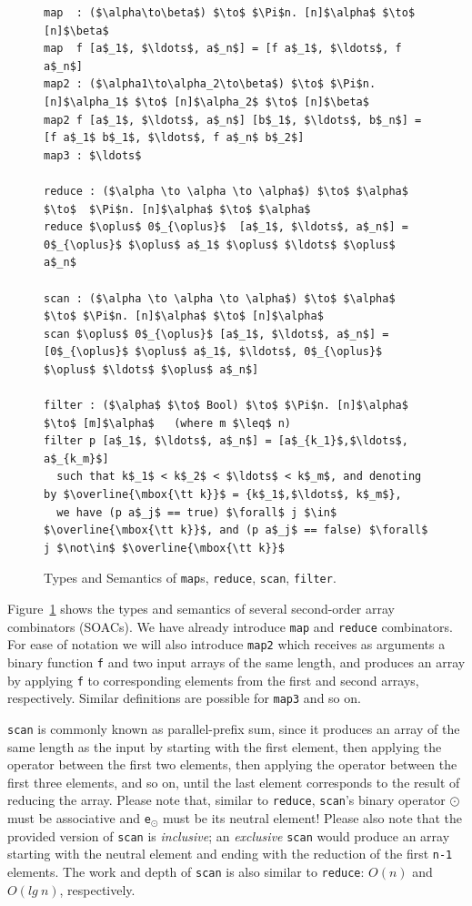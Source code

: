 \documentclass[acmsmall,review]{acmart}\settopmatter{printfolios=true,printccs=false,printacmref=false}
\begin{document}
\begin{figure}
\begin{lstlisting}[mathescape=true]
map  : ($\alpha\to\beta$) $\to$ $\Pi$n. [n]$\alpha$ $\to$ [n]$\beta$
map  f [a$_1$, $\ldots$, a$_n$] = [f a$_1$, $\ldots$, f a$_n$]
map2 : ($\alpha1\to\alpha_2\to\beta$) $\to$ $\Pi$n. [n]$\alpha_1$ $\to$ [n]$\alpha_2$ $\to$ [n]$\beta$
map2 f [a$_1$, $\ldots$, a$_n$] [b$_1$, $\ldots$, b$_n$] = [f a$_1$ b$_1$, $\ldots$, f a$_n$ b$_2$]
map3 : $\ldots$

reduce : ($\alpha \to \alpha \to \alpha$) $\to$ $\alpha$ $\to$  $\Pi$n. [n]$\alpha$ $\to$ $\alpha$
reduce $\oplus$ 0$_{\oplus}$  [a$_1$, $\ldots$, a$_n$] = 0$_{\oplus}$ $\oplus$ a$_1$ $\oplus$ $\ldots$ $\oplus$ a$_n$

scan : ($\alpha \to \alpha \to \alpha$) $\to$ $\alpha$ $\to$ $\Pi$n. [n]$\alpha$ $\to$ [n]$\alpha$
scan $\oplus$ 0$_{\oplus}$ [a$_1$, $\ldots$, a$_n$] = [0$_{\oplus}$ $\oplus$ a$_1$, $\ldots$, 0$_{\oplus}$ $\oplus$ $\ldots$ $\oplus$ a$_n$]

filter : ($\alpha$ $\to$ Bool) $\to$ $\Pi$n. [n]$\alpha$ $\to$ [m]$\alpha$   (where m $\leq$ n)
filter p [a$_1$, $\ldots$, a$_n$] = [a$_{k_1}$,$\ldots$, a$_{k_m}$]
  such that k$_1$ < k$_2$ < $\ldots$ < k$_m$, and denoting by $\overline{\mbox{\tt k}}$ = {k$_1$,$\ldots$, k$_m$},
  we have (p a$_j$ == true) $\forall$ j $\in$ $\overline{\mbox{\tt k}}$, and (p a$_j$ == false) $\forall$ j $\not\in$ $\overline{\mbox{\tt k}}$
\end{lstlisting}\vspace{-4ex}
\caption{Types and Semantics of \lstinline{map}s, \lstinline{reduce}, \lstinline{scan}, \lstinline{filter}.}
\label{fig:futhark-par-ops}
\end{figure}

Figure~\ref{fig:futhark-par-ops} shows the types and semantics of several second-order
array combinators (SOACs). We have already introduce \lstinline{map} and 
\lstinline{reduce} combinators. For ease of notation we will also introduce
\lstinline{map2} which receives as arguments a binary function {\tt f} and 
two input arrays of the same length, and produces an array by applying {\tt f}
to corresponding elements from the first and second arrays, respectively. 
Similar definitions are possible for {\tt map3} and so on.

\lstinline{scan} is commonly known as parallel-prefix sum, since it produces
an array of the same length as the input by starting with the first element,
then applying the operator between the first two elements, then applying the
operator between the first three elements, and so on, until the last element
corresponds to the result of reducing the array. Please note that, similar to
\lstinline{reduce}, \lstinline{scan}'s binary operator $\odot$ must be associative
and {\tt e$_\odot$} must be its neutral element! Please also note that
the provided version of \lstinline{scan} is \emph{inclusive}; an \emph{exclusive}
\lstinline{scan} would produce an array starting with the neutral element and
ending with the reduction of the first {\tt n-1} elements. The work and depth
of \lstinline{scan} is also similar to \lstinline{reduce}: $O(n)$ and $O(lg~n)$,
respectively.
\end{document}
